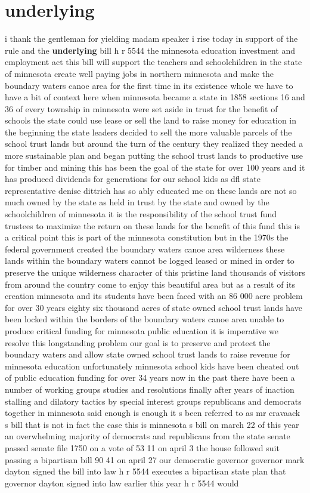 \documentclass{article}
\begin{document}
\section*{underlying}
i thank the gentleman for yielding madam speaker i rise today in support of the rule and the {\bf \color{red} underlying} bill h r 5544 the minnesota education investment and employment act this bill will support the teachers and schoolchildren in the state of minnesota create well paying jobs in northern minnesota and make the boundary waters canoe area for the first time in its existence whole we have to have a bit of context here when minnesota became a state in 1858 sections 16 and 36 of every township in minnesota were set aside in trust for the benefit of schools the state could use lease or sell the land to raise money for education in the beginning the state leaders decided to sell the more valuable parcels of the school trust lands but around the turn of the century they realized they needed a more sustainable plan and began putting the school trust lands to productive use for timber and mining this has been the goal of the state for over 100 years and it has produced dividends for generations for our school kids as dfl state representative denise dittrich has so ably educated me on these lands are not so much owned by the state as held in trust by the state and owned by the schoolchildren of minnesota it is the responsibility of the school trust fund trustees to maximize the return on these lands for the benefit of this fund this is a critical point this is part of the minnesota constitution but in the 1970s the federal government created the boundary waters canoe area wilderness these lands within the boundary waters cannot be logged leased or mined in order to preserve the unique wilderness character of this pristine land thousands of visitors from around the country come to enjoy this beautiful area but as a result of its creation minnesota and its students have been faced with an 86 000 acre problem for over 30 years eighty six thousand acres of state owned school trust lands have been locked within the borders of the boundary waters canoe area unable to produce critical funding for minnesota public education it is imperative we resolve this longstanding problem our goal is to preserve and protect the boundary waters and allow state owned school trust lands to raise revenue for minnesota education unfortunately minnesota school kids have been cheated out of public education funding for over 34 years now in the past there have been a number of working groups studies and resolutions finally after years of inaction stalling and dilatory tactics by special interest groups republicans and democrats together in minnesota said enough is enough it s been referred to as mr cravaack s bill that is not in fact the case this is minnesota s bill on march 22 of this year an overwhelming majority of democrats and republicans from the state senate passed senate file 1750 on a vote of 53 11 on april 3 the house followed suit passing a bipartisan bill 90 41 on april 27 our democratic governor governor mark dayton signed the bill into law h r 5544 executes a bipartisan state plan that governor dayton signed into law earlier this year h r 5544 would 
\end{document}
